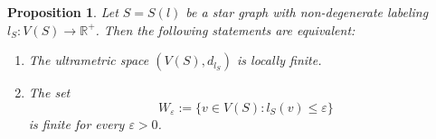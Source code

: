 \documentclass[pdflatex,sn-mathphys-num]{sn-jnl}%
\newtheorem{proposition}{Proposition}%
\theoremstyle{thmstyletwo}%
\begin{document}
\begin{proposition}\label{dfuj247}
Let $S = S(l)$ be a star graph with non-degenerate labeling $l_S \colon V(S) \to \mathbb{R}^{+}$. Then the following statements are equivalent:
\begin{enumerate}[label=\textit{(\roman*)}, left=0pt] 
\item The ultrametric space $(V(S), d_{l_S})$ is locally finite.

\item The set 
\begin{equation}\label{rvgujq}
W_\varepsilon := \{v \in V(S) \colon l_S(v) \leq \varepsilon\}
\end{equation}
is finite for every $\varepsilon > 0$.
\end{enumerate}
\end{proposition}
\end{document}
